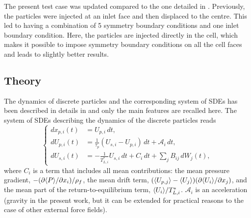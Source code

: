 The present test case was updated compared to the one detailed in \cite{Rep2}. Previously, the particles were injected at an inlet face and then displaced to the centre.  This led to having a combination of 5 symmetry boundary conditions and one inlet boundary condition.  Here, the particles are injected directly in the cell, which makes it possible to impose symmetry boundary conditions on all the cell faces and leads to slightly better results.

\subsection{Theory}
The dynamics of discrete particles and the corresponding system of SDEs has been described in details in \cite{Rep3} and only the main features are recalled here. The system of SDEs describing the dynamics of the discrete particles reads
\begin{equation}
\left\{
\begin{aligned} \label{eq:lagr:num_scheme:sysEDS}
dx_{p,i}(t) & = U_{p,i}\, dt, \\
dU_{p,i}(t) & =\frac{1}{\tau_p}(U_{s,i}-U_{p,i})\, dt + \mathcal{A}_i\,dt,\\
dU_{s,i}(t) & =-\frac{1}{T_{L,i}^*}U_{s,i}\,dt+C_i\, dt + \sum_j
B_{ij}\, dW_j(t),
\end{aligned} \right .
\end{equation}
where $C_i$ is a term that includes all mean contributions: the mean pressure gradient, $-(\partial \langle P \rangle/\partial x_i)/\rho_f$, the mean drift term, $(\langle U_{p,j} \rangle-\langle U_j \rangle)(\partial \langle U_i \rangle/\partial x_j)$, and the mean part of the return-to-equilibrium term, $\langle U_i \rangle/T^*_{L,i}$. $\mathcal{A}_i$ is an acceleration (gravity in the present work, but it can be extended for practical reasons to the case of other external force fields).

